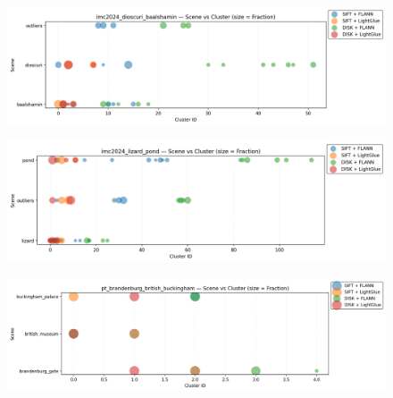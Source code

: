 \documentclass[report.tex]{subfiles}
\begin{document}
    \begin{figure}\ContinuedFloat
        \begin{minipage}{\textwidth}
            \centering
            \includegraphics[width=\linewidth]{images/scene_cluster_by_dataset/imc2024_dioscuri_baalshamin.png}
            \label{fig:scene-cluster-A4}
        \end{minipage}

        \begin{minipage}{\textwidth}
            \centering
            \includegraphics[width=\linewidth]{images/scene_cluster_by_dataset/imc2024_lizard_pond.png}
            \label{fig:scene-cluster-A5}
        \end{minipage}

        \begin{minipage}{\textwidth}
            \centering
            \includegraphics[width=\linewidth]{images/scene_cluster_by_dataset/pt_brandenburg_british_buckingham.png}
            \label{fig:scene-cluster-A6}
        \end{minipage}
    \end{figure}
\end{document}
